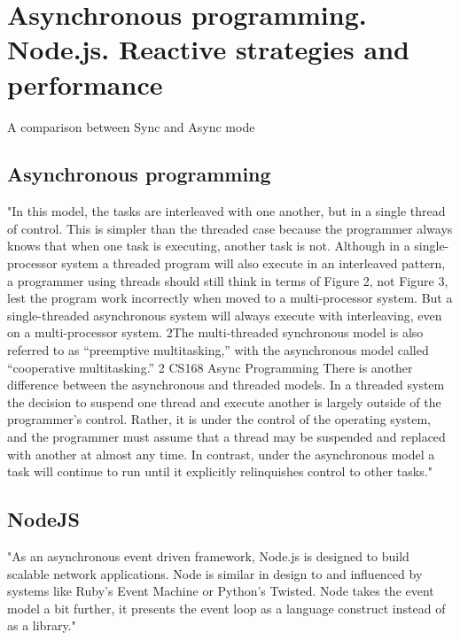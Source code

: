 \chapter{Asynchronous programming. Node.js. Reactive strategies and performance}

A comparison between Sync and Async mode\cite{asyncGraph}

\section{Asynchronous programming}
"In this model, the tasks are interleaved with one another, but in a single thread of control. This is simpler
than the threaded case because the programmer always knows that when one task is executing, another
task is not. Although in a single-processor system a threaded program will also execute in an interleaved
pattern, a programmer using threads should still think in terms of Figure 2, not Figure 3, lest the program
work incorrectly when moved to a multi-processor system. But a single-threaded asynchronous system will
always execute with interleaving, even on a multi-processor system.
2The multi-threaded synchronous model is also referred to as “preemptive multitasking,” with the asynchronous model called
“cooperative multitasking.”
2
CS168 Async Programming
There is another difference between the asynchronous and threaded models. In a threaded system the
decision to suspend one thread and execute another is largely outside of the programmer’s control. Rather,
it is under the control of the operating system, and the programmer must assume that a thread may be
suspended and replaced with another at almost any time. In contrast, under the asynchronous model a task
will continue to run until it explicitly relinquishes control to other tasks."\cite{asyncArticle}

\section{NodeJS}

"As an asynchronous event driven framework, Node.js is designed to build scalable network applications. 
Node is similar in design to and influenced by systems like Ruby's Event Machine or Python's Twisted. 
Node takes the event model a bit further, it presents the event loop as a language construct instead of as a library." \cite{nodejsabout}

